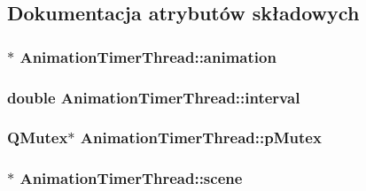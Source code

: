 \subsection{Dokumentacja atrybutów składowych}
\hypertarget{class_animation_timer_thread_aae21c4abd63a79a1df8122444d1a8813}{
\subsubsection[{animation}]{$\ast$ Animation\-Timer\-Thread\-::animation\hspace{0.3cm}{\ttfamily [private]}}}\label{class_animation_timer_thread_aae21c4abd63a79a1df8122444d1a8813}
\hypertarget{class_animation_timer_thread_a7c99944245eb6574e966bd4db5a0055d}{
\subsubsection[{interval}]{\setlength{\rightskip}{0pt plus 5cm}double Animation\-Timer\-Thread\-::interval\hspace{0.3cm}{\ttfamily [private]}}}\label{class_animation_timer_thread_a7c99944245eb6574e966bd4db5a0055d}
\hypertarget{class_animation_timer_thread_a05984499ec314e871b9a13c4295b62a8}{
\subsubsection[{p\-Mutex}]{\setlength{\rightskip}{0pt plus 5cm}Q\-Mutex$\ast$ Animation\-Timer\-Thread\-::p\-Mutex\hspace{0.3cm}{\ttfamily [private]}}}\label{class_animation_timer_thread_a05984499ec314e871b9a13c4295b62a8}
\hypertarget{class_animation_timer_thread_a7fe67347fd7ebd156414e68447713b49}{
\subsubsection[{scene}]{$\ast$ Animation\-Timer\-Thread\-::scene\hspace{0.3cm}{\ttfamily [private]}}}\label{class_animation_timer_thread_a7fe67347fd7ebd156414e68447713b49}
